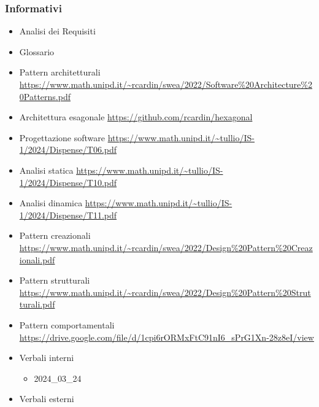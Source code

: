 \subsubsection{Informativi}
\begin{itemize}
    \item Analisi dei Requisiti
    \item Glossario
    \item Pattern architetturali \url{https://www.math.unipd.it/~rcardin/swea/2022/Software%20Architecture%20Patterns.pdf}
    \item Architettura esagonale \url{https://github.com/rcardin/hexagonal}
    \item Progettazione software \url{https://www.math.unipd.it/~tullio/IS-1/2024/Dispense/T06.pdf}
    \item Analisi statica \url{https://www.math.unipd.it/~tullio/IS-1/2024/Dispense/T10.pdf}
    \item Analisi dinamica \url{https://www.math.unipd.it/~tullio/IS-1/2024/Dispense/T11.pdf}
    \item Pattern creazionali \url{https://www.math.unipd.it/~rcardin/swea/2022/Design%20Pattern%20Creazionali.pdf}
    \item Pattern strutturali \url{https://www.math.unipd.it/~rcardin/swea/2022/Design%20Pattern%20Strutturali.pdf}
    \item Pattern comportamentali \url{https://drive.google.com/file/d/1cpi6rORMxFtC91nI6_sPrG1Xn-28z8eI/view}
    \item Verbali interni
        \begin{itemize}
            \item 2024\_03\_24
        \end{itemize}
    \item Verbali esterni
\end{itemize}
